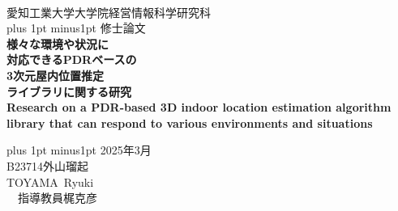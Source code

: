 \begin{titlepage}
    \begin{center}


        \ \vspace{19mm}

        \LARGE\baselineskip=13mm
        愛知工業大学大学院経営情報科学研究科 \\
        \kanjiskip=12pt plus 1pt minus1pt
        修士論文 \\[1mm]

        {\Huge\baselineskip=13mm
        \textbf{様々な環境や状況に\\対応できるPDRベースの\\3次元屋内位置推定\\ライブラリに関する研究} \\
        \textbf{
Research on a PDR-based 3D indoor location estimation algorithm library that can respond to various environments and situations} \\
        }

        \vspace{80mm}

        \kanjiskip=9pt plus 1pt minus1pt
        2025年3月 \\
        B23714\hspace{1zw}外山瑠起 \\
        TOYAMA\ Ryuki \\
        \ \hbox{\kanjiskip=0pt 指導教員}\hspace{1zw}梶克彦\hspace{1zw}

    \end{center}
\end{titlepage}
